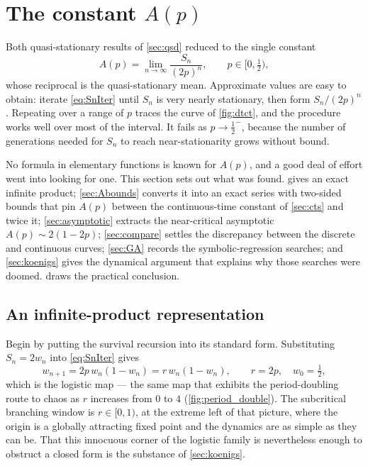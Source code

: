 \section{The constant \texorpdfstring{$A(p)$}{A(p)}}
\label{sec:Ap}

Both quasi-stationary results of \cref{sec:qsd} reduced to the single constant
\begin{equation}
\label{eq:Apdef}
A(p) = \lim_{n\to\infty}\frac{S_n}{(2p)^n},
\qquad p\in[0,\tfrac12),
\end{equation}
whose reciprocal is the quasi-stationary mean. Approximate values are easy to obtain:
iterate \cref{eq:SnIter} until $S_n$ is very nearly stationary, then form $S_n/(2p)^n$.
Repeating over a range of $p$ traces the curve of \cref{fig:dtct}, and the procedure
works well over most of the interval. It fails as $p\to\tfrac12^-$, because the number of
generations needed for $S_n$ to reach near-stationarity grows without bound.

No formula in elementary functions is known for $A(p)$, and a good deal of effort went
into looking for one. This section sets out what was found.  gives an
exact infinite product; \cref{sec:Abounds} converts it into an exact series with
two-sided bounds that pin $A(p)$ between the continuous-time constant of \cref{sec:cts}
and twice it; \cref{sec:asymptotic} extracts the near-critical asymptotic
$A(p)\sim2(1-2p)$; \cref{sec:compare} settles the discrepancy between the discrete and
continuous curves; \cref{sec:GA} records the symbolic-regression searches; and
\cref{sec:koenigs} gives the dynamical argument that explains why those searches were
doomed.  draws the practical conclusion.

\subsection{An infinite-product representation}
\label{sec:product}

Begin by putting the survival recursion into its standard form. Substituting
$S_n = 2w_n$ into \cref{eq:SnIter} gives
\begin{equation}
\label{eq:logistic}
w_{n+1} = 2p\,w_n(1-w_n) = r\,w_n(1-w_n),
\qquad r = 2p,\quad w_0 = \tfrac12 ,
\end{equation}
which is the logistic map --- the same map that exhibits the period-doubling route to
chaos as $r$ increases from $0$ to $4$ (\cref{fig:period_double}). The subcritical
branching window is $r\in[0,1)$, at the extreme left of that picture, where the origin is
a globally attracting fixed point and the dynamics are as simple as they can be. That
this innocuous corner of the logistic family is nevertheless enough to obstruct a closed
form is the substance of \cref{sec:koenigs}.

